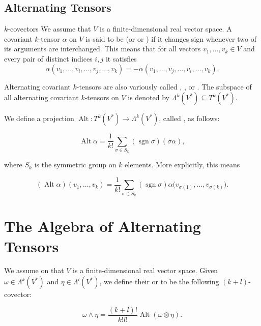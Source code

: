 \documentclass[../main.tex]{subfiles}
\begin{document}
\subsection*{Alternating Tensors}

\begin{definition}{{\(k\)-covectors}}{}
    We  assume that \(V\) is a finite-dimensional real vector space. A covariant \(k\)-tensor \(\alpha\) on \(V\) is said to be  (or  or ) if it changes sign whenever two of its arguments are interchanged. This means that for all vectors \(v_{1},\ldots,v_{k}\in V\) and every pair of distinct indices \(i,j\) it satisfies
\[
\alpha(v_{1},\ldots,v_{i},\ldots,v_{j},\ldots,v_{k})
=-\alpha(v_{1},\ldots,v_{j},\ldots,v_{i},\ldots,v_{k}).
\]

Alternating covariant \(k\)-tensors are also variously called , , or . The subspace of all alternating covariant \(k\)-tensors on \(V\) is denoted by \(\Lambda^{k}(V^{*})\subseteq T^{k}(V^{*})\).
\end{definition}

\begin{definition}{}{}
     We define a  projection \(\operatorname{Alt}: T^k(V^*) \to \Lambda^k(V^*)\), called , as follows:

\[
\operatorname{Alt}\alpha = \frac{1}{k!} \sum_{\sigma \in S_k} (\operatorname{sgn}\sigma)(\sigma\alpha),
\]

where \(S_k\) is the symmetric group on \(k\) elements. More explicitly, this means

\[
(\operatorname{Alt}\alpha)(v_1,\ldots,v_k) = \frac{1}{k!} \sum_{\sigma \in S_k} (\operatorname{sgn}\sigma)\alpha\bigl(v_{\sigma(1)},\ldots,v_{\sigma(k)}\bigr).
\]
\end{definition}
\section{The Algebra of Alternating Tensors}
\begin{definition}{}{}
    We  assume on that \(V\) is a finite-dimensional real vector space. Given \(\omega \in \Lambda^{k}(V^{*})\) and \(\eta \in \Lambda^{l}(V^{*})\), we define their  or  to be the following \((k+l)\)-covector:

\begin{equation}
\omega \wedge \eta = \frac{(k+l)!}{k!l!} \operatorname{Alt}(\omega \otimes \eta).
\end{equation}
\end{definition}
\end{document}
